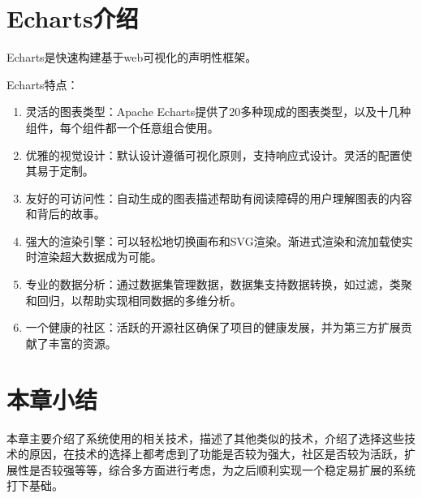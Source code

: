\section{Echarts介绍}

Echarts是快速构建基于web可视化的声明性框架。

Echarts特点：
\begin{enumerate}
  \item 灵活的图表类型：Apache Echarts提供了20多种现成的图表类型，以及十几种组件，每个组件都一个任意组合使用。
  \item 优雅的视觉设计：默认设计遵循可视化原则，支持响应式设计。灵活的配置使其易于定制。
  \item 友好的可访问性：自动生成的图表描述帮助有阅读障碍的用户理解图表的内容和背后的故事。
  \item 强大的渲染引擎：可以轻松地切换画布和SVG渲染。渐进式渲染和流加载使实时渲染超大数据成为可能。
  \item 专业的数据分析：通过数据集管理数据，数据集支持数据转换，如过滤，类聚和回归，以帮助实现相同数据的多维分析。
  \item 一个健康的社区：活跃的开源社区确保了项目的健康发展，并为第三方扩展贡献了丰富的资源。
\end{enumerate}

\section{本章小结}

本章主要介绍了系统使用的相关技术，描述了其他类似的技术，介绍了选择这些技术的原因，在技术的选择上都考虑到了功能是否较为强大，社区是否较为活跃，扩展性是否较强等等，综合多方面进行考虑，为之后顺利实现一个稳定易扩展的系统打下基础。